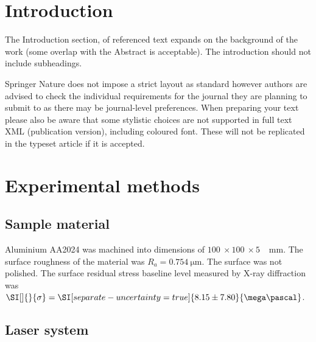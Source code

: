 \documentclass[sn-nature]{sn-jnl}%
\theoremstyle{thmstyleone}%
\theoremstyle{thmstyletwo}%
\theoremstyle{thmstylethree}%
\begin{document}
\section{Introduction}\label{sec1}

The Introduction section, of referenced text \cite{bib1} expands on the background of the work (some overlap with the Abstract is acceptable). The introduction should not include subheadings.

Springer Nature does not impose a strict layout as standard however authors are advised to check the individual requirements for the journal they are planning to submit to as there may be journal-level preferences. When preparing your text please also be aware that some stylistic choices are not supported in full text XML (publication version), including coloured font. These will not be replicated in the typeset article if it is accepted.                                                                                                                                         

\section{Experimental methods}\label{sec:methods}


    \subsection{Sample material}
    Aluminium AA2024 was machined into dimensions of \(\SI[]{100}{} \times \SI[]{100}{} \times \SI[]{5}{}\) \SI[]{}{\mm}. The surface roughness of the material was \( R_a  = \SI[]{0.754}{\micro\metre} \). The surface was not polished.  The surface residual stress baseline level measured by X-ray diffraction was  \( \SI[]{}{\sigma}  = \SI[separate-uncertainty = true]{8.15 \pm 7.80 }{\mega\pascal} \).


    \subsection{Laser system}
\end{document}
